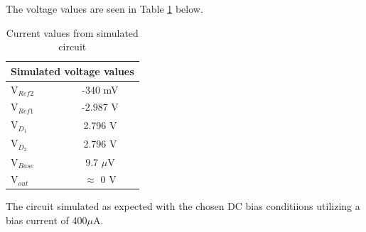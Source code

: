 The voltage values are seen in Table \ref{tab:simcircuitvoltage} below. 

\begin{table}[H]
	\centering
	\caption{Current values from simulated circuit}
	\label{tab:simcircuitvoltage}
	\begin{tabular}{|l|c|}
		\hline
		\multicolumn{2}{|l|}{Simulated voltage values}                            \\ \hline
		V$_{Ref2}$ & -340 mV                                                  \\ \hline
		V$_{Ref1}$ & -2.987 V                                                 \\ \hline
		V$_{D_1}$ & 2.796 V                                                  \\ \hline
		V$_{D_2}$  & 2.796 V                                      \\ \hline
		V$_{Base}$   & 9.7 $\mu$V										 \\	\hline
		V$_{out}$ & $\approx$ 0 V \\ \hline
	\end{tabular}
\end{table}

The circuit simulated as expected with the chosen DC bias conditiions utilizing a bias current of 400$\mu$A.


